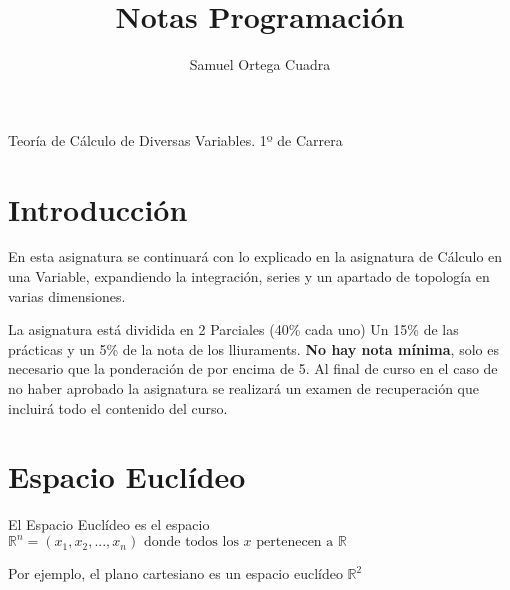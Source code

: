 \documentclass[11pt]{article}
\title{Notas Programación}
\author{Samuel Ortega Cuadra}
\theoremstyle{plain}
\begin{document}
    \begin{center}
        \huge{Teoría de Cálculo de Diversas Variables. 1º de Carrera}
    \end{center}
    \tableofcontents
    \newpage
    \section{Introducción} %
    \label{sec:introducción}
        En esta asignatura se continuará con lo explicado en la asignatura de Cálculo en una Variable, expandiendo la integración, series y un apartado de topología en varias dimensiones.

        La asignatura está dividida en 2 Parciales (40\% cada uno) Un 15\% de las prácticas y un 5\% de la nota de los lliuraments. \textbf{No hay nota mínima}, solo es necesario que la ponderación de por encima de 5. Al final de curso en el caso de no haber aprobado la asignatura se realizará un examen de recuperación que incluirá todo el contenido del curso. 
    \section{Espacio Euclídeo} %
    \label{sec:espacio_euclídeo}
        El Espacio Euclídeo es el espacio $\mathbb{R}^n = {(x_{1},x_{2},...,x_{n}) \text{ donde todos los $x$ pertenecen a } \mathbb{R}}$

        Por ejemplo, el plano cartesiano es un espacio euclídeo $\mathbb{R}^2$
\end{document}

